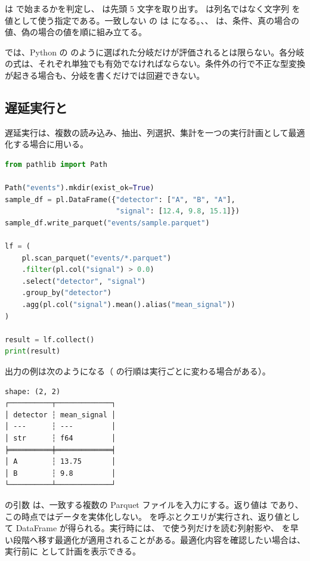  は  で始まるかを判定し、 は先頭 5 文字を取り出す。 は列名ではなく文字列  を値として使う指定である。一致しない  の  は  になる。、、 は、条件、真の場合の値、偽の場合の値を順に組み立てる。

 では、Python の  のように選ばれた分岐だけが評価されるとは限らない。各分岐の式は、それぞれ単独でも有効でなければならない。条件外の行で不正な型変換が起きる場合も、分岐を書くだけでは回避できない。

\subsection{遅延実行と }

遅延実行は、複数の読み込み、抽出、列選択、集計を一つの実行計画として最適化する場合に用いる。

\begin{lstlisting}[language=Python]
from pathlib import Path

Path("events").mkdir(exist_ok=True)
sample_df = pl.DataFrame({"detector": ["A", "B", "A"],
                          "signal": [12.4, 9.8, 15.1]})
sample_df.write_parquet("events/sample.parquet")

lf = (
    pl.scan_parquet("events/*.parquet")
    .filter(pl.col("signal") > 0.0)
    .select("detector", "signal")
    .group_by("detector")
    .agg(pl.col("signal").mean().alias("mean_signal"))
)

result = lf.collect()
print(result)
\end{lstlisting}

出力の例は次のようになる（ の行順は実行ごとに変わる場合がある）。

\begin{lstlisting}[numbers=none, xleftmargin=2\zw]
shape: (2, 2)
┌──────────┬─────────────┐
│ detector ┆ mean_signal │
│ ---      ┆ ---         │
│ str      ┆ f64         │
╞══════════╪═════════════╡
│ A        ┆ 13.75       │
│ B        ┆ 9.8         │
└──────────┴─────────────┘
\end{lstlisting}

 の引数  は、一致する複数の Parquet ファイルを入力にする。返り値は  であり、この時点ではデータを実体化しない。 を呼ぶとクエリが実行され、返り値として DataFrame が得られる。実行時には、 で使う列だけを読む列射影や、 を早い段階へ移す最適化が適用されることがある。最適化内容を確認したい場合は、実行前に  として計画を表示できる。

